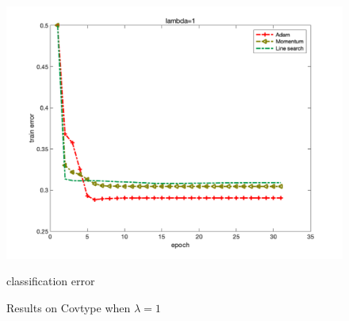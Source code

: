 \documentclass{article}
\begin{document}
\begin{figure}[H]
\begin{minipage}{0.33\linewidth}
		\includegraphics[width=1\linewidth]{./fig/err_c2}
		\caption{classification error}
	\end{minipage}
	\caption*{Results on Covtype when $\lambda=1$}
\end{figure}
\end{document}
